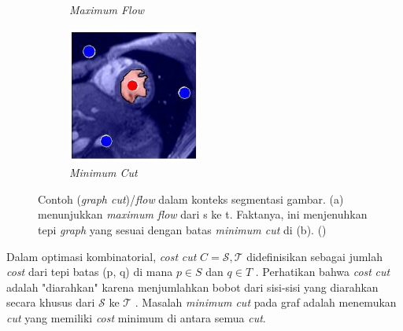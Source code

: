 \begin{figure}[H]
\begin{subfigure}{0.3\textwidth}
      \caption{\emph{Maximum Flow}}
    \end{subfigure}  
    \begin{subfigure}{0.3\textwidth}
      \centering{}
      \includegraphics[width=\textwidth]{gambar/gambar-2b.png}
      \caption{\emph{Minimum Cut}}
    \end{subfigure}   
  \caption{
    Contoh (\emph{graph cut})/\emph{flow} dalam konteks segmentasi gambar. 
    (a) menunjukkan \emph{maximum flow} dari s ke t. Faktanya, ini menjenuhkan tepi 
    \emph{graph} yang sesuai dengan batas \emph{minimum cut} di (b). (\cite{Boykov:2004})
    }
    \label{img:contoh_flow}
\end{figure}
Dalam optimasi kombinatorial, \emph{cost} \emph{cut} \(C = {\mathcal{S,T}}\) didefinisikan sebagai 
jumlah \emph{cost} dari tepi batas (p, q) di mana \(p \in S\) dan \(q \in T\) . Perhatikan 
bahwa \emph{cost} \emph{cut} adalah "diarahkan" karena menjumlahkan bobot dari sisi-sisi 
yang diarahkan secara khusus dari \(\mathcal{S}\) ke \(\mathcal{T}\) . Masalah \emph{minimum cut}  pada 
graf adalah menemukan \emph{cut} yang memiliki \emph{cost} minimum di antara semua \emph{cut}. 

